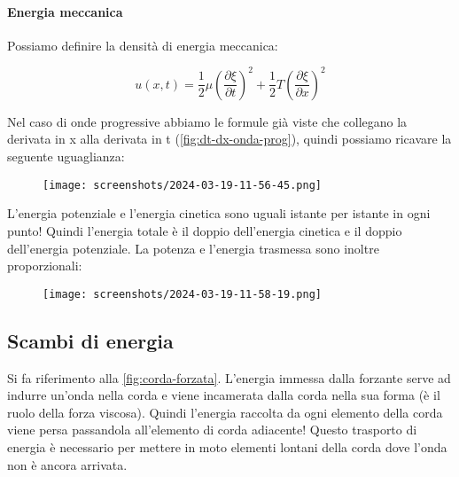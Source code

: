 \paragraph{Energia meccanica}
Possiamo definire la densità di energia meccanica:
\begin{definition}
	\[
		u(x,t) = \frac{1}{2} \mu \left( \frac{\partial \xi }{\partial t}  \right) ^{2} + \frac{1}{2}T\left( \frac{\partial \xi }{\partial x}  \right) ^{2}
	\]
\end{definition}
Nel caso di onde progressive abbiamo le formule già viste che collegano la derivata in x alla derivata in t (\autoref{fig:dt-dx-onda-prog}), quindi possiamo ricavare la seguente uguaglianza:
\begin{figure}[H]
	\centering
	\texttt{[image: screenshots/2024-03-19-11-56-45.png]}
\end{figure}
L'energia potenziale e l'energia cinetica sono uguali istante per istante in ogni punto! Quindi l'energia totale è il doppio dell'energia cinetica e il doppio dell'energia potenziale. La potenza e l'energia trasmessa sono inoltre proporzionali:
\begin{figure}[H]
	\centering
	\texttt{[image: screenshots/2024-03-19-11-58-19.png]}
\end{figure}

\subsection{Scambi di energia}
Si fa riferimento alla \autoref{fig:corda-forzata}. L'energia immessa dalla forzante serve ad indurre un'onda nella corda e viene incamerata dalla corda nella sua forma (è il ruolo della forza viscosa). Quindi l'energia raccolta da ogni elemento della corda viene persa passandola all'elemento di corda adiacente! Questo trasporto di energia è necessario per mettere in moto elementi lontani della corda dove l'onda non è ancora arrivata.

